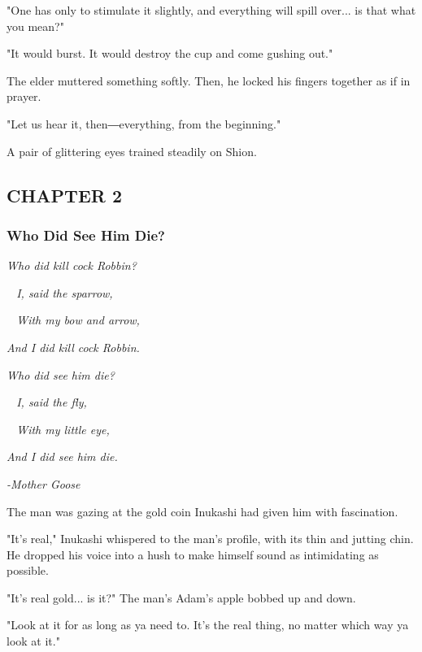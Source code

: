 "One has only to stimulate it slightly, and everything will spill
over... is that what you mean?"

"It would burst. It would destroy the cup and come gushing out."

The elder muttered something softly. Then, he locked his fingers
together as if in prayer.

"Let us hear it, then―everything, from the beginning."

A pair of glittering eyes trained steadily on Shion.

\hypertarget{index_split_001_split_002.htmlux5cux23calibre_pb_30}{}

\protect\hypertarget{index_split_030.html}{}{}

\hypertarget{index_split_030.htmlux5cux23calibre_pb_0}{}

\hypertarget{index_split_030.htmlux5cux23calibre_toc_3}{%
\subsection{CHAPTER 2}\label{index_split_030.htmlux5cux23calibre_toc_3}}

\subsubsection{Who Did See Him Die?}

\emph{Who did kill cock Robbin?}

\emph{~ I, said the sparrow,}

\emph{~ With my bow and arrow,}

\emph{And I did kill cock Robbin.}

\emph{Who did see him die?}

\emph{~ I, said the fly,}

\emph{~ With my little eye,}

\emph{And I did see him die.}

\emph{-Mother Goose}

The man was gazing at the gold coin Inukashi had given him with
fascination.

"It's real," Inukashi whispered to the man's profile, with its thin and
jutting chin. He dropped his voice into a hush to make himself sound as
intimidating as possible.

"It's real gold... is it?" The man's Adam's apple bobbed up and down.

"Look at it for as long as ya need to. It's the real thing, no matter
which way ya look at it."


